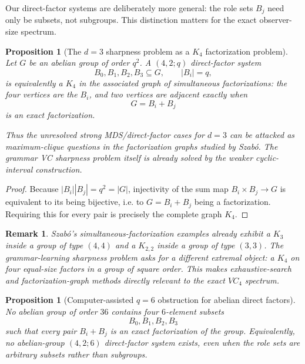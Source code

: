 \documentclass[11pt]{article}
\newtheorem{proposition}[theorem]{Proposition}
\newtheorem{remark}[theorem]{Remark}
\begin{document}
Our direct-factor systems are deliberately more general: the role sets
\(B_j\) need only be subsets, not subgroups.  This distinction matters for
the exact observer-size spectrum.

\begin{proposition}[The \(d=3\) sharpness problem as a \(K_4\) factorization problem]
\label{prop:k4-factorization}
Let \(G\) be an abelian group of order \(q^2\).  A
\((4,2;q)\) direct-factor system
\[
 B_0,B_1,B_2,B_3\subseteq G,\qquad |B_i|=q,
\]
is equivalently a \(K_4\) in the associated graph of simultaneous
factorizations: the four vertices are the \(B_i\), and two vertices are
adjacent exactly when
\[
 G=B_i+B_j
\]
is an exact factorization.

Thus the unresolved \emph{strong MDS/direct-factor} cases for \(d=3\) can be attacked as
maximum-clique questions in the factorization graphs studied by Szab\'o.  The
grammar VC sharpness problem itself is already solved by the weaker cyclic-interval
construction.
\end{proposition}

\begin{proof}
Because \(|B_i||B_j|=q^2=|G|\), injectivity of the sum map
\(B_i\times B_j\to G\) is equivalent to its being bijective, i.e. to
\(G=B_i+B_j\) being a factorization.  Requiring this for every pair is
precisely the complete graph \(K_4\).
\end{proof}

\begin{remark}
Szab\'o's simultaneous-factorization examples already exhibit a \(K_3\)
inside a group of type \((4,4)\) and a \(K_{2,2}\) inside a group of type
\((3,3)\).  The grammar-learning sharpness problem asks for a different
extremal object: a \(K_4\) on four equal-size factors in a group of square
order.  This makes exhaustive-search and factorization-graph methods directly
relevant to the exact \(VC_4\) spectrum.
\end{remark}

\begin{proposition}[Computer-assisted \(q=6\) obstruction for abelian direct factors]
\label{prop:q6-computational}
No abelian group of order \(36\) contains four \(6\)-element subsets
\[
 B_0,B_1,B_2,B_3
\]
such that every pair \(B_i+B_j\) is an exact factorization of the group.
Equivalently, no abelian-group \((4,2;6)\) direct-factor system exists, even
when the role sets are arbitrary subsets rather than subgroups.
\end{proposition}
\end{document}
